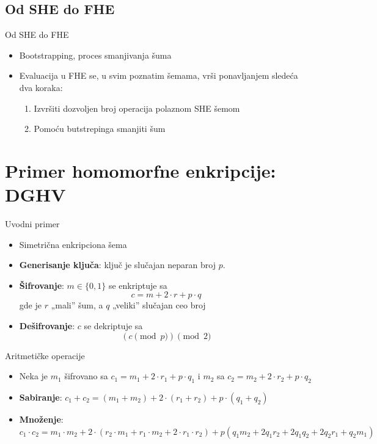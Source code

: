 \documentclass[aspectratio=1610]{beamer}
\begin{document}
\subsection{Od SHE do FHE}
\begin{frame}{Od SHE do FHE}
\begin{itemize}
    \item Bootstrapping, proces smanjivanja \v suma
    \item Evaluacija u FHE se, u svim poznatim \v semama, vr\v si ponavljanjem slede\' ca dva koraka:
    \begin{enumerate}
        \item  Izvr\v siti dozvoljen broj operacija polaznom SHE \v semom
        \item  Pomo\' cu butstrepinga smanjiti \v sum 
    \end{enumerate}
\end{itemize}
\end{frame}

\section{Primer homomorfne enkripcije: DGHV}
\begin{frame}{Uvodni primer}
\begin{itemize}
    \item Simetri\v cna enkripciona \v sema 
    \item \textbf{Generisanje ključa}: ključ je slučajan neparan broj $p$.
    \item \textbf{\v Sifrovanje}: $m \in \{0, 1\}$ se enkriptuje sa $$c=m + 2\cdot r + p\cdot q$$ gde je $r$ „mali” \v sum, a $q$ „veliki” slu\v cajan ceo broj
    \item \textbf{De\v sifrovanje}: $c$ se dekriptuje sa $$(c \pmod{p})\pmod{2}$$
\end{itemize}
\end{frame}

\begin{frame}{Aritmeti\v cke operacije}
\begin{itemize}
    \item Neka je $m_1$ \v sifrovano sa $c_1=m_1 + 2\cdot r_1 + p\cdot q_1$ i $m_2$ sa $c_2=m_2 + 2\cdot r_2 + p\cdot q_2$
    \item \textbf{Sabiranje}: $c_1 + c_2 = (m_1 + m_2) + 2\cdot (r_1 + r_2) + p\cdot (q_1 + q_2)$
    \item \textbf{Mno\v zenje}: $c_1\cdot c_2 = m_1\cdot m_2 + 2\cdot (r_2\cdot m_1 + r_1\cdot m_2 + 2\cdot r_1\cdot r_2) + p(q_1m_2 + 2q_1r_2 + 2q_1q_2 + 2q_2r_1 + q_2m_1)$
\end{itemize}
\end{frame}
\end{document}
